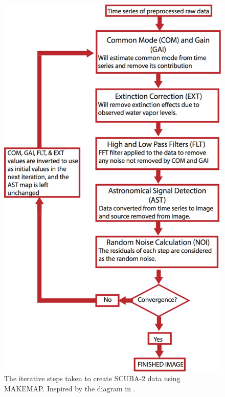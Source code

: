 \begin{figure}
  \centering
  \includegraphics[scale=0.8]{obs_imgs/makemap_flow.jpg}
  \caption[Iterative Steps Used In MAKEMAP]{The iterative steps taken to create SCUBA-2 data using MAKEMAP.  Inspired by the diagram in \cite{chapin2013}.}
  \label{fig:flow}
\end{figure}


